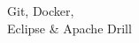 \documentclass[]{hieudo-build}
\begin{document}
\begin{minipage}[t]{0.34\textwidth}
Git, Docker,\\
Eclipse \& Apache Drill \\ 

\sectionsep








\end{minipage}
\end{document}
